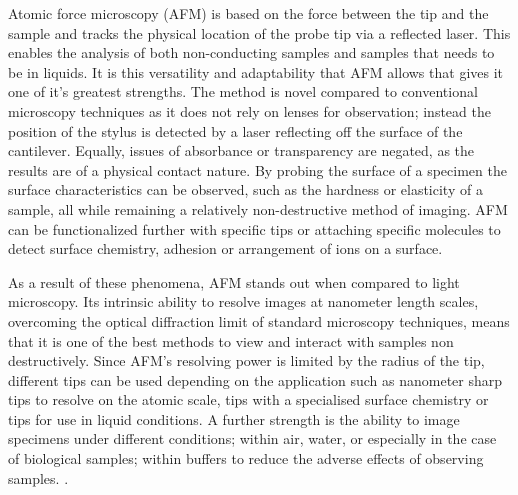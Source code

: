 Atomic force microscopy (AFM) is based on the force between the tip and the sample and tracks the physical location of the probe tip via a reflected laser. This enables the analysis of both non-conducting samples and samples that needs to be in liquids. It is this versatility and adaptability that AFM allows that gives it one of it's greatest strengths. The method is novel compared to conventional microscopy techniques as it does not rely on lenses for observation; instead the position of the stylus is detected by a laser reflecting off the surface of the cantilever. Equally, issues of absorbance or transparency are negated, as the results are of a physical contact nature. By probing the surface of a specimen the surface characteristics can be observed, such as the hardness or elasticity of a sample, all while remaining a relatively non-destructive method of imaging. AFM can be functionalized further with specific tips or attaching specific molecules to detect surface chemistry, adhesion or arrangement of ions on a surface\cite{KislonAfm}. 


As a result of these phenomena, AFM stands out when compared to light microscopy. Its intrinsic ability to resolve images at nanometer length scales, overcoming the optical diffraction limit of standard microscopy techniques, means that it is one of the best methods to view and interact with samples non destructively. Since AFM's resolving power is limited by the radius of the tip, different tips can be used depending on the application such as nanometer sharp tips to resolve on the atomic scale, tips with a specialised surface chemistry or tips for use in liquid conditions. A further strength is the ability to image specimens under different conditions; within air, water, or especially in the case of biological samples; within buffers to reduce the adverse effects of observing samples. \cite{WetAFM}. 

